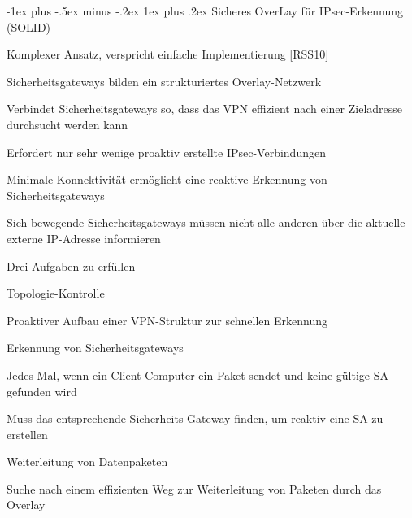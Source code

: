 \documentclass[a4paper]{article}
\makeatletter
\renewcommand{\subsubsection}{\@startsection{subsubsection}{3}{0mm}%
 {-1ex plus -.5ex minus -.2ex}%
 {1ex plus .2ex}%
 {\normalfont\small\bfseries}}
\makeatother
\begin{document}
\begin{multicols}{3}
\begin{itemize*}
            \subsubsection{Sicheres OverLay für IPsec-Erkennung
                  (SOLID)}
            \begin{itemize*}
                  \item       Komplexer Ansatz, verspricht einfache Implementierung {[}RSS10{]}
                  \item       Sicherheitsgateways bilden ein strukturiertes Overlay-Netzwerk
                  \begin{itemize*}
                        \item Verbindet Sicherheitsgateways so, dass das VPN effizient nach einer Zieladresse durchsucht werden kann
                  \end{itemize*}
                  \item       Erfordert nur sehr wenige proaktiv erstellte IPsec-Verbindungen
                  \begin{itemize*}
                        \item Minimale Konnektivität ermöglicht eine reaktive Erkennung von Sicherheitsgateways
                        \item Sich bewegende Sicherheitsgateways müssen nicht alle anderen über die aktuelle externe IP-Adresse informieren
                  \end{itemize*}
                  \item       Drei Aufgaben zu erfüllen
                  \begin{itemize*}
                        \item Topologie-Kontrolle
                        \begin{itemize*} \item Proaktiver Aufbau einer VPN-Struktur zur schnellen Erkennung \end{itemize*}
                        \item Erkennung von Sicherheitsgateways
                        \begin{itemize*} \item Jedes Mal, wenn ein Client-Computer ein Paket sendet und keine gültige SA gefunden wird \item Muss das entsprechende Sicherheits-Gateway finden, um reaktiv eine SA zu erstellen \end{itemize*}
                        \item Weiterleitung von Datenpaketen
                        \begin{itemize*} \item Suche nach einem effizienten Weg zur Weiterleitung von Paketen durch das Overlay \end{itemize*}
                  \end{itemize*}
            \end{itemize*}


\end{itemize*}
\end{multicols}
\end{document}
